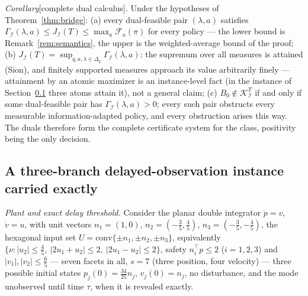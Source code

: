 \documentclass[10pt,twocolumn]{article}
\theoremstyle{plain}
\theoremstyle{definition}
\theoremstyle{remark}
\begin{document}
\noindent\emph{Corollary}[complete dual calculus].
\label{cor:dual}
Under the hypotheses of Theorem~\ref{thm:bridge}: (a) every dual-feasible
pair \((\lambda, a)\) satisfies
\(\Gamma_{\mathcal{I}}(\lambda, a) \le J_{\mathcal{I}}(T) \le
\max_a \mathcal{F}_a(\pi)\) for every policy --- the lower bound is
Remark~\ref{rem:semantics}, the upper is the weighted-average bound of
the proof; (b) \(J_{\mathcal{I}}(T) = \sup_{q, a, \lambda \in
\Delta_q} \Gamma_{\mathcal{I}}(\lambda, a)\): the supremum over all
measures is attained (Sion), and finitely supported measures approach its
value arbitrarily finely --- attainment by an atomic maximizer is an
instance-level fact (in the instance of Section~\ref{instance} three
atoms attain it), not a general claim; (c) \(B_0 \notin
\mathcal{K}_{\mathcal{I}}^T\) if and only if some dual-feasible pair has
\(\Gamma_{\mathcal{I}}(\lambda, a) > 0\); every such pair obstructs
every measurable information-adapted policy, and every obstruction arises
this way. The duals therefore form the complete certificate system for
the class, positivity being the only decision.

\subsection{A three-branch delayed-observation instance carried exactly}\label{instance}

\emph{Plant and exact delay threshold.} Consider the planar double integrator
\(\dot p = v\), \(\dot v = u\), with unit vectors \(n_1 = (1,0)\),
\(n_2 = (-\tfrac35, \tfrac45)\), \(n_3 = (-\tfrac35, -\tfrac45)\), the
hexagonal input set
\(U = \mathrm{conv}\{\pm n_1, \pm n_2, \pm n_3\}\), equivalently
\(\{\nu : |u_2| \le \tfrac45,\ |2u_1 + u_2| \le 2,\ |2u_1 - u_2| \le 2\}\),
safety \(n_i^\top p \le 2\) (\(i = 1,2,3\)) and
\(|v_1|, |v_2| \le \tfrac65\) --- seven facets in all, \(s = 7\) (three
position, four velocity) --- three possible initial states
\(p_j(0) = \tfrac{34}{25} n_j\), \(v_j(0) = n_j\), no disturbance, and the
mode unobserved until time \(\tau\), when it is revealed exactly.
\end{document}
